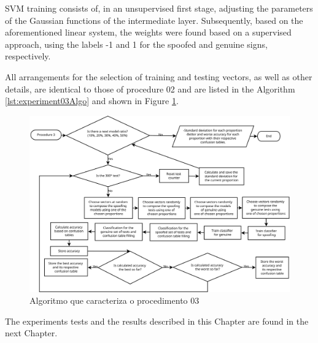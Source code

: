 			\par SVM training consists of, in an unsupervised first stage, adjusting the parameters of the Gaussian functions of the intermediate layer. Subsequently, based on the aforementioned linear system, the weights were found based on a supervised approach, using the labels -1 and 1 for the spoofed and genuine signs, respectively.   
			
			\par All arrangements for the selection of training and testing vectors, as well as other details, are identical to those of procedure 02 and are listed in the Algorithm \ref{lst:experiment03Algo} and shown in Figure \ref{fig:experiment03Algo}. 
			
			
			
			\begin{figure}[h]
				\centering
				\includegraphics[width=0.9\linewidth]{images/AlgoProcedure03}
				\caption{Algoritmo que caracteriza o procedimento 03}
				\label{fig:experiment03Algo}
			\end{figure}
			
			\par The experiments tests and the results described in this Chapter are found in the next Chapter.